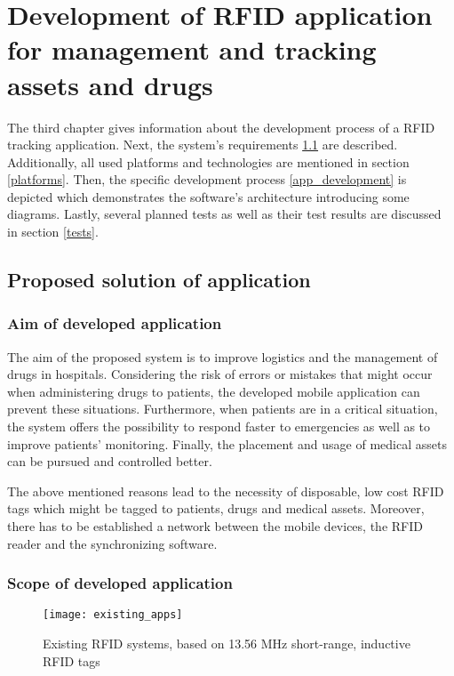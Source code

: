 \chapter{Development of RFID application for management and tracking assets and drugs}
\label{Kap3}

The third chapter gives information about the development process of a RFID tracking application. Next, the system's requirements \ref{requirements} are described. Additionally, all used platforms and technologies are mentioned in section \ref{platforms}. Then, the specific development process \ref{app_development} is depicted which demonstrates the software's architecture introducing some diagrams. Lastly, several planned tests as well as their test results are discussed in section \ref{tests}.

\section{Proposed solution of application}\label{requirements}

\subsection{Aim of developed application}

The aim of the proposed system is to improve logistics and the management of drugs in hospitals. Considering the risk of errors or mistakes that might occur when administering drugs to patients, the developed mobile application can prevent these situations. Furthermore, when patients are in a critical situation, the system offers the possibility to respond faster to emergencies as well as to improve patients' monitoring. Finally, the placement and usage of medical assets can be pursued and controlled better. 

The above mentioned reasons lead to the necessity of disposable, low cost RFID tags which might be tagged to patients, drugs and medical assets. Moreover, there has to be established a network between the mobile devices, the RFID reader and the synchronizing software. 

\subsection{Scope of developed application}

\begin{figure}
\centering
\texttt{[image: existing\_apps]} 
\caption{\label{fig:existing_apps} Existing RFID systems, based on 13.56 MHz short-range, inductive RFID tags} 
\end{figure}

